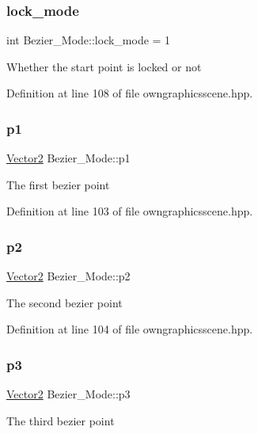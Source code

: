 \subsubsection{\texorpdfstring{lock\+\_\+mode}{lock\_mode}}
{\footnotesize\ttfamily int Bezier\+\_\+\+Mode\+::lock\+\_\+mode = 1}

Whether the start point is locked or not 

Definition at line 108 of file owngraphicsscene.\+hpp.

\mbox{\label{structBezier__Mode_a2d7c5ccccb03114fd1b26a20843a59e4}} 
\subsubsection{\texorpdfstring{p1}{p1}}
{\footnotesize\ttfamily \mbox{\hyperlink{classVector2}{Vector2}} Bezier\+\_\+\+Mode\+::p1}

The first bezier point 

Definition at line 103 of file owngraphicsscene.\+hpp.

\mbox{\label{structBezier__Mode_a96ed0f4076e540e5a8789f25f9bf65e9}} 
\subsubsection{\texorpdfstring{p2}{p2}}
{\footnotesize\ttfamily \mbox{\hyperlink{classVector2}{Vector2}} Bezier\+\_\+\+Mode\+::p2}

The second bezier point 

Definition at line 104 of file owngraphicsscene.\+hpp.

\mbox{\label{structBezier__Mode_ad9fbff84a5248923ceb29433dc58f49b}} 
\subsubsection{\texorpdfstring{p3}{p3}}
{\footnotesize\ttfamily \mbox{\hyperlink{classVector2}{Vector2}} Bezier\+\_\+\+Mode\+::p3}

The third bezier point 

